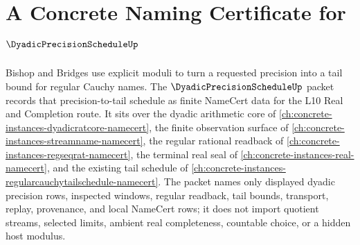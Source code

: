 \chapter{A Concrete Naming Certificate for $\DyadicPrecisionScheduleUp$}
\label{ch:concrete-instances-dyadic-precision-schedule-namecert}

Bishop and Bridges use explicit moduli to turn a requested precision into a tail bound for regular Cauchy names. The $\DyadicPrecisionScheduleUp$ packet records that precision-to-tail schedule as finite NameCert data for the L10 Real and Completion route. It sits over the dyadic arithmetic core of \autoref{ch:concrete-instances-dyadicratcore-namecert}, the finite observation surface of \autoref{ch:concrete-instances-streamname-namecert}, the regular rational readback of \autoref{ch:concrete-instances-regseqrat-namecert}, the terminal real seal of \autoref{ch:concrete-instances-real-namecert}, and the existing tail schedule of \autoref{ch:concrete-instances-regularcauchytailschedule-namecert}. The packet names only displayed dyadic precision rows, inspected windows, regular readback, tail bounds, transport, replay, provenance, and local NameCert rows; it does not import quotient streams, selected limits, ambient real completeness, countable choice, or a hidden host modulus.

